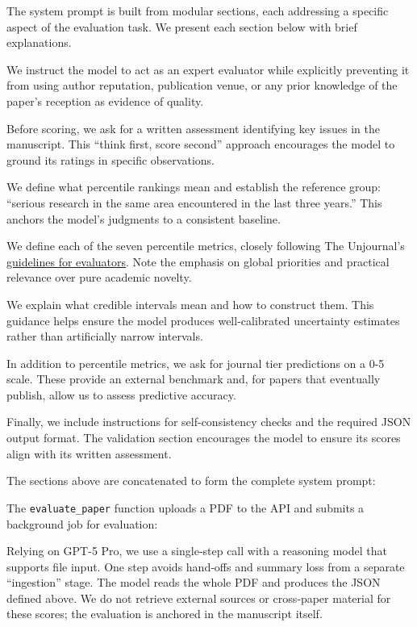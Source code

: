 \documentclass[
  11pt,
  letterpaper,
  DIV=11,
  numbers=noendperiod]{scrreprt}
\begin{document}
The system prompt is built from modular sections, each addressing a
specific aspect of the evaluation task. We present each section below
with brief explanations.

We instruct the model to act as an expert evaluator while explicitly
preventing it from using author reputation, publication venue, or any
prior knowledge of the paper's reception as evidence of quality.

Before scoring, we ask for a written assessment identifying key issues
in the manuscript. This ``think first, score second'' approach
encourages the model to ground its ratings in specific observations.

We define what percentile rankings mean and establish the reference
group: ``serious research in the same area encountered in the last three
years.'' This anchors the model's judgments to a consistent baseline.

We define each of the seven percentile metrics, closely following The
Unjournal's
\href{https://globalimpact.gitbook.io/the-unjournal-project-and-communication-space/policies-projects-evaluation-workflow/evaluation/guidelines-for-evaluators}{guidelines
for evaluators}. Note the emphasis on global priorities and practical
relevance over pure academic novelty.

We explain what credible intervals mean and how to construct them. This
guidance helps ensure the model produces well-calibrated uncertainty
estimates rather than artificially narrow intervals.

In addition to percentile metrics, we ask for journal tier predictions
on a 0-5 scale. These provide an external benchmark and, for papers that
eventually publish, allow us to assess predictive accuracy.

Finally, we include instructions for self-consistency checks and the
required JSON output format. The validation section encourages the model
to ensure its scores align with its written assessment.

The sections above are concatenated to form the complete system prompt:

The \texttt{evaluate\_paper} function uploads a PDF to the API and
submits a background job for evaluation:

Relying on GPT-5 Pro, we use a single‑step call with a reasoning model
that supports file input. One step avoids hand‑offs and summary loss
from a separate ``ingestion'' stage. The model reads the whole PDF and
produces the JSON defined above. We do not retrieve external sources or
cross‑paper material for these scores; the evaluation is anchored in the
manuscript itself.
\end{document}

